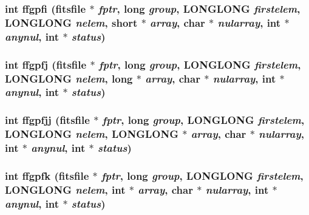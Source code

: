 \subsubsection{\setlength{\rightskip}{0pt plus 5cm}int ffgpfi (\bf{fitsfile} $\ast$ {\em fptr}, long {\em group}, \bf{LONGLONG} {\em firstelem}, \bf{LONGLONG} {\em nelem}, short $\ast$ {\em array}, char $\ast$ {\em nularray}, int $\ast$ {\em anynul}, int $\ast$ {\em status})}\label{test_2shm__client_2fitsio_8h_f29072567714e2050dec2f834a1890c8}


\subsubsection{\setlength{\rightskip}{0pt plus 5cm}int ffgpfj (\bf{fitsfile} $\ast$ {\em fptr}, long {\em group}, \bf{LONGLONG} {\em firstelem}, \bf{LONGLONG} {\em nelem}, long $\ast$ {\em array}, char $\ast$ {\em nularray}, int $\ast$ {\em anynul}, int $\ast$ {\em status})}\label{test_2shm__client_2fitsio_8h_348a086c25d23b4b453e20483c0552a2}


\subsubsection{\setlength{\rightskip}{0pt plus 5cm}int ffgpfjj (\bf{fitsfile} $\ast$ {\em fptr}, long {\em group}, \bf{LONGLONG} {\em firstelem}, \bf{LONGLONG} {\em nelem}, \bf{LONGLONG} $\ast$ {\em array}, char $\ast$ {\em nularray}, int $\ast$ {\em anynul}, int $\ast$ {\em status})}\label{test_2shm__client_2fitsio_8h_b8dd1aed0cf184dd27347a3ad89bd888}


\subsubsection{\setlength{\rightskip}{0pt plus 5cm}int ffgpfk (\bf{fitsfile} $\ast$ {\em fptr}, long {\em group}, \bf{LONGLONG} {\em firstelem}, \bf{LONGLONG} {\em nelem}, int $\ast$ {\em array}, char $\ast$ {\em nularray}, int $\ast$ {\em anynul}, int $\ast$ {\em status})}\label{test_2shm__client_2fitsio_8h_39fded4193b93f54f993961de406751f}


